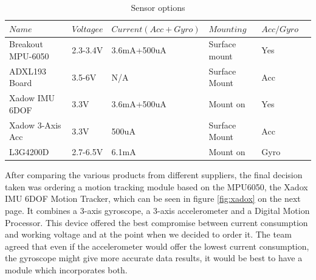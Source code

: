 \begin{table}[h]
	\centering
	\caption{Sensor options}
	\label{table: componentsx}
	\begin{tabular}{llllll}
		\hline
		$Name$ & $Voltagee$ & $Current(Acc+Gyro)$ & $Mounting$ & $Acc/Gyro$ \\
		\hline
		Breakout MPU-6050 & 2.3-3.4V & 3.6mA+500uA & Surface mount & Yes\\
		\hline
		 ADXL193 Board & 3.5-6V & N/A & Surface Mount & Acc \\
		\hline
		Xadow IMU 6DOF  & 3.3V &  3.6mA+500uA & Mount on & Yes \\
		\hline
		Xadow 3-Axis Acc &  3.3V & 500uA & Surface Mount & Acc \\
		\hline
		 L3G4200D &  2.7-6.5V & 6.1mA & Mount on  & Gyro \\
		\hline
		
		\end{tabular}
			
\end{table}
After comparing the various products from different suppliers, the final decision taken was ordering a motion tracking module based on the MPU6050, the Xadox IMU 6DOF Motion Tracker, which can be seen in figure \ref{fig:xadox} on the next page. It combines a 3-axis gyroscope, a 3-axis accelerometer and a Digital Motion Processor. This device offered the best compromise between current consumption and working voltage and at the point when we decided to order it. The team agreed that even if the accelerometer would offer the lowest current consumption, the gyroscope might give more accurate data results, it would be best to have a module which incorporates both.
